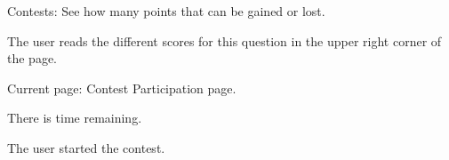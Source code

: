 \begin{uc}{Contests: See how many points that can be gained or lost.}

    \begin{uc-mss}
    \item The user reads the different scores for this question in the upper right corner of the page.
    \end{uc-mss}

    \begin{uc-pre}
    \item Current page: Contest Participation page.
    \item There is time remaining. 
    \end{uc-pre}

    \begin{uc-trig}
    The user started the contest. 
    \end{uc-trig}

\end{uc}
